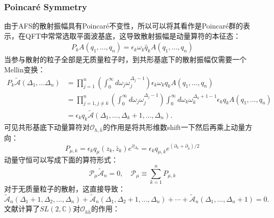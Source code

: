 \subsubsection{Poincar\'e Symmetry}
由于AFS的散射振幅具有Poincar\'e不变性，所以可以将其看作是Poincar\'e群的表示，在QFT中常常选取平面波基底，这导致散射振幅是动量算符的本征态：
\begin{eqnarray}
	{P}_kA(q_1,...,q_n)=\epsilon_k\omega_k\hat q_kA(q_1,...,q_n)
\end{eqnarray}
当参与散射的粒子全部是无质量粒子时，到共形基底下的散射振幅仅需要一个Mellin变换：
\begin{equation}
	\begin{aligned}
		P_k\widetilde{\mathcal{A}}(\Delta_1,...\Delta_n)& =\prod_{j=1}^n\left(\int_0^\infty d\omega_j\omega_j^{\Delta_j-1}\right)\epsilon_k\omega_k{q}_kA(q_1,...,q_n)  \\
		&=\prod_{{j=1},{{j\neq k}}}^n\left(\int_0^\infty d\omega_j\omega_j^{\Delta_j-1}\right)\int_0^\infty d\omega_k\omega_k^{\Delta_k+1-1}\epsilon_k{q}_kA(q_1,...,q_n) \\
		&=\epsilon_k{q}_k\widetilde{\mathcal{A}}(\Delta_1,...,\Delta_k+1,...,\Delta_n).
	\end{aligned}
\end{equation}
可见共形基底下动量算符对$\mathcal{O}_{h,\bar h}$的作用是将共形维数shift一下然后再乘上动量方向：
\begin{equation}
	\boxed{
		P_{\mu,k}=\epsilon_kq_\mu(z_k,\bar{z}_k)e^{\partial_{\Delta_k}}=\epsilon_{k}q_{\mu,k} e^{\left(\partial_h+\partial_{\bar{h}}\right)/2}
	}
\end{equation}
动量守恒可以写成下面的算符形式：
\begin{equation}\label{50.7}
	\boxed{
		\mathcal{P}_\mu\widetilde{\mathcal{A}}_n=0,\quad\mathcal{P}_\mu\equiv\sum_{k=1}^nP_{\mu,k}
	}
\end{equation}
对于无质量粒子的散射，这直接导致：
\begin{equation}
	\widetilde{\mathcal{A}}_n(\Delta_1+1,\Delta_2,...,\Delta_n)+\widetilde{\mathcal{A}}_n(\Delta_1,\Delta_2+1,...,\Delta_n)+\cdots+\widetilde{\mathcal{A}}_n(\Delta_1,...,\Delta_n+1)=0.
\end{equation}
文献\cite{Stieberger:2018onx}计算了$SL(2,\mathbb{C})$对$\mathcal{O}_{h\bar h}$的作用：
